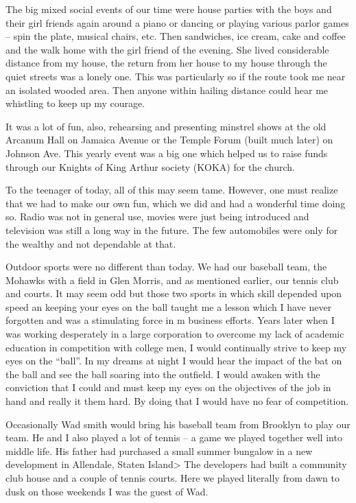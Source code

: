 \documentclass[12pt]{book}              %
\begin{document}
The big mixed social events of our time were house parties with the boys and their girl friends again around a piano or dancing or playing various parlor games -- spin the plate, musical chairs, etc. Then sandwiches, ice cream, cake and coffee and the walk home with the girl friend of the evening. She lived considerable distance from my house, the return from her house to my house through the quiet streets was a lonely one. This was particularly so if the route took me near an isolated wooded area. Then anyone within hailing distance could hear me whistling to keep up my courage. 

It was a lot of fun, also, rehearsing and presenting minstrel shows at the old Arcanum Hall on Jamaica Avenue or the Temple Forum (built much later) on Johnson Ave. This yearly event was a big one which helped us to raise funds through our Knights of King Arthur society (KOKA) for the church.

To the teenager of today, all of this may seem tame. However, one must realize that we had to make our own fun, which we did and had a wonderful time doing so. Radio was not in general use, movies were just being introduced and television was still a long way in the future. The few automobiles were only for the wealthy and not dependable at that.

Outdoor sports were no different than today. We had our baseball team, the Mohawks with a field in Glen Morris, and as mentioned earlier, our tennis club and courts. It may seem odd but those two sports in which skill depended upon speed an keeping your eyes on the ball taught me a lesson which I have never forgotten and was a stimulating force in m business efforts. Years later when I was working desperately in a large corporation to overcome my lack of academic education in competition with college men, I would continually strive to keep my eyes on the ``ball''. In my dreams at night I would hear the impact of the bat on the ball and see the ball soaring into the outfield. I would awaken with the conviction that I could and must keep my eyes on the objectives of the job in hand and really it them hard. By doing that I would have no fear of competition. 

Occasionally Wad smith would bring his baseball team from Brooklyn to play our team. He and I also played a lot of tennis -- a game we played together well into middle life. His father had purchased a small summer bungalow in a new development in Allendale, Staten Island> The developers had built a community club house and a couple of tennis courts. Here we played literally from dawn to dusk on those weekends I was the guest of Wad.
\end{document}
